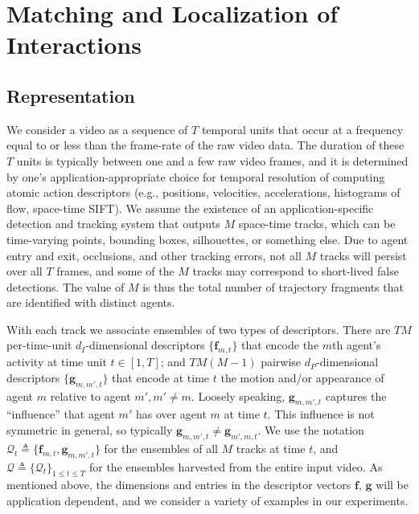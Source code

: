 \section{Matching and Localization of Interactions}

\vspace{-5pt}

\subsection{Representation}

\vspace{-5pt}

We consider a video as a sequence of $T$ temporal units that occur at a frequency equal to or less than the frame-rate of the raw video data. The duration of these $T$ units is typically between one and a  few raw video frames, and it is determined by one's application-appropriate choice for temporal resolution of computing atomic action descriptors (e.g., positions, velocities, accelerations, histograms of flow, space-time SIFT). We assume the existence of an application-specific detection and tracking system that outputs $M$ space-time tracks, which can be time-varying points, bounding boxes, silhouettes, or something else. Due to agent entry and exit, occlusions, and other tracking errors, not all $M$ tracks will persist over all $T$ frames, and some of the $M$ tracks may correspond to short-lived false detections.  The value of $M$ is thus the total number of trajectory fragments that are identified with distinct agents.

With each track we associate ensembles of two types of descriptors. There are $TM$ per-time-unit $d_{I}$-dimensional descriptors $\{\mathbf{f}_{m,t}\}$ that encode the $m$th agent's activity at time unit $t\in[1, T]$; and $TM(M-1)$ pairwise $d_{P}$-dimensional descriptors $\{\mathbf{g}_{m,m',t}\}$ that encode at time $t$ the motion and/or appearance of agent $m$ relative to agent $m', m'\ne m$. Loosely speaking, $\mathbf{g}_{m,m',t}$ captures the ``influence'' that agent $m'$ has over agent $m$ at time $t$. This influence is not symmetric in general, so typically $\mathbf{g}_{m,m',t}\ne \mathbf{g}_{m',m,t}$.  We use the notation $\mathcal{Q}_{t}\triangleq\{\mathbf{f}_{m,t},\mathbf{g}_{m,m',t}\}$ for the ensembles of all $M$ tracks at time $t$, and $\mathcal{Q}\triangleq\{\mathcal{Q}_{t}\}_{1\leq t\leq T}$ for the ensembles harvested from the entire input video. As mentioned above, the dimensions and entries in the descriptor vectors $\mathbf{f}$, $\mathbf{g}$ will be application dependent, and we consider a variety of examples in our experiments.


